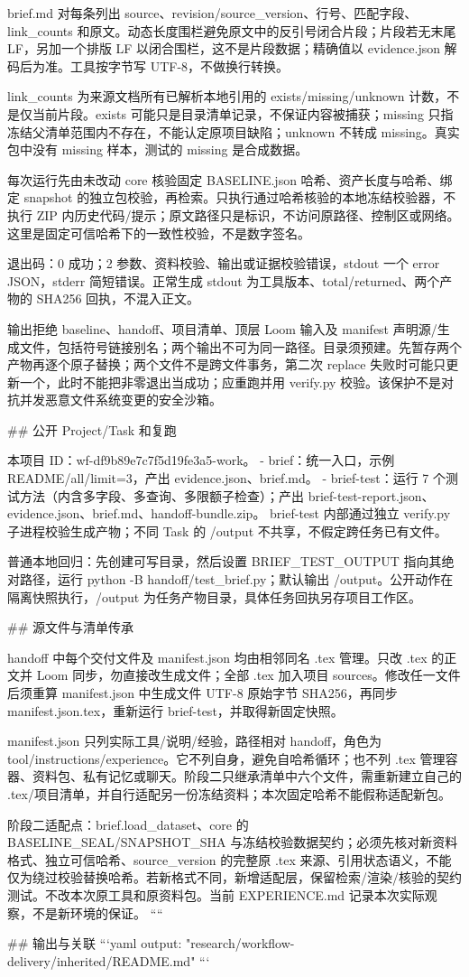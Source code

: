brief.md 对每条列出 source、revision/source_version、行号、匹配字段、link_counts 和原文。动态长度围栏避免原文中的反引号闭合片段；片段若无末尾 LF，另加一个排版 LF 以闭合围栏，这不是片段数据；精确值以 evidence.json 解码后为准。工具按字节写 UTF-8，不做换行转换。

link_counts 为来源文档所有已解析本地引用的 exists/missing/unknown 计数，不是仅当前片段。exists 可能只是目录清单记录，不保证内容被捕获；missing 只指冻结父清单范围内不存在，不能认定原项目缺陷；unknown 不转成 missing。真实包中没有 missing 样本，测试的 missing 是合成数据。

每次运行先由未改动 core 核验固定 BASELINE.json 哈希、资产长度与哈希、绑定 snapshot 的独立包校验，再检索。只执行通过哈希核验的本地冻结校验器，不执行 ZIP 内历史代码/提示；原文路径只是标识，不访问原路径、控制区或网络。这里是固定可信哈希下的一致性校验，不是数字签名。

退出码：0 成功；2 参数、资料校验、输出或证据校验错误，stdout 一个 error JSON，stderr 简短错误。正常生成 stdout 为工具版本、total/returned、两个产物的 SHA256 回执，不混入正文。

输出拒绝 baseline、handoff、项目清单、顶层 Loom 输入及 manifest 声明源/生成文件，包括符号链接别名；两个输出不可为同一路径。目录须预建。先暂存两个产物再逐个原子替换；两个文件不是跨文件事务，第二次 replace 失败时可能只更新一个，此时不能把非零退出当成功；应重跑并用 verify.py 校验。该保护不是对抗并发恶意文件系统变更的安全沙箱。

## 公开 Project/Task 和复跑

本项目 ID：wf-df9b89e7c7f5d19fe3a5-work。
- brief：统一入口，示例 README/all/limit=3，产出 evidence.json、brief.md。
- brief-test：运行 7 个测试方法（内含多字段、多查询、多限额子检查）；产出 brief-test-report.json、evidence.json、brief.md、handoff-bundle.zip。
brief-test 内部通过独立 verify.py 子进程校验生成产物；不同 Task 的 /output 不共享，不假定跨任务已有文件。

普通本地回归：先创建可写目录，然后设置 BRIEF_TEST_OUTPUT 指向其绝对路径，运行 python -B handoff/test_brief.py；默认输出 /output。公开动作在隔离快照执行，/output 为任务产物目录，具体任务回执另存项目工作区。

## 源文件与清单传承

handoff 中每个交付文件及 manifest.json 均由相邻同名 .tex 管理。只改 .tex 的正文并 Loom 同步，勿直接改生成文件；全部 .tex 加入项目 sources。修改任一文件后须重算 manifest.json 中生成文件 UTF-8 原始字节 SHA256，再同步 manifest.json.tex，重新运行 brief-test，并取得新固定快照。

manifest.json 只列实际工具/说明/经验，路径相对 handoff，角色为 tool/instructions/experience。它不列自身，避免自哈希循环；也不列 .tex 管理容器、资料包、私有记忆或聊天。阶段二只继承清单中六个文件，需重新建立自己的 .tex/项目清单，并自行适配另一份冻结资料；本次固定哈希不能假称适配新包。

阶段二适配点：brief.load_dataset、core 的 BASELINE_SEAL/SNAPSHOT_SHA 与冻结校验数据契约；必须先核对新资料格式、独立可信哈希、source_version 的完整原 .tex 来源、引用状态语义，不能仅为绕过校验替换哈希。若新格式不同，新增适配层，保留检索/渲染/核验的契约测试。不改本次原工具和原资料包。当前 EXPERIENCE.md 记录本次实际观察，不是新环境的保证。
````

## 输出与关联
```yaml
output: "research/workflow-delivery/inherited/README.md"
```
